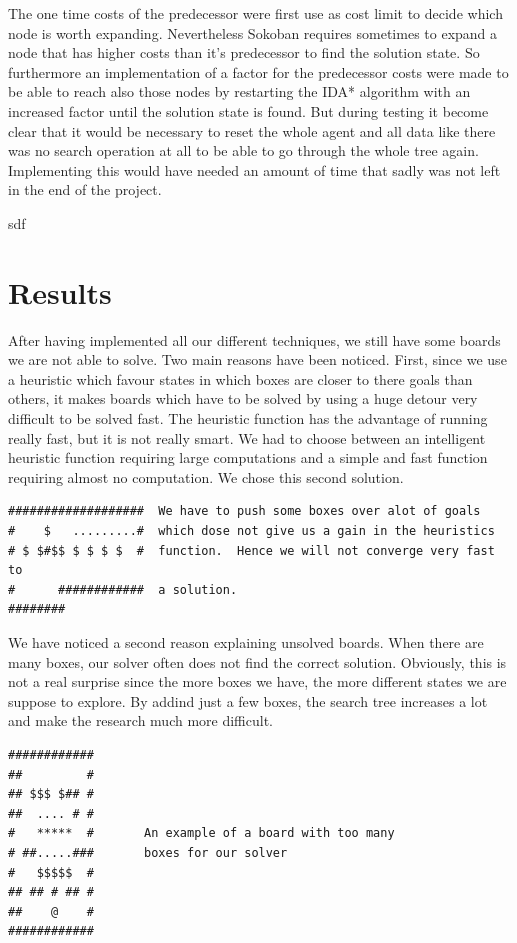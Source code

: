 \documentclass[a4paper,10pt]{article}
\begin{document}
	The one time costs of the predecessor were first use as cost limit to decide which node is worth expanding. Nevertheless 		Sokoban requires sometimes to expand a node that has higher costs than it's predecessor to find the solution state. 
	So furthermore an implementation of a factor for the predecessor costs were made to be able to reach also those nodes by 		restarting the IDA* algorithm with an increased factor until the solution state is found. But during testing it become clear 		that it would be necessary to reset the whole agent and all data like there was no search operation at all to be able to go 		through the whole tree again. Implementing this would have needed an amount of time that sadly was not left in the end of the 		project.

        sdf~\cite{solving_soko}


\section{Results}
After having implemented all our different techniques, we still have some boards we are not able to solve. Two main reasons have been noticed. First, since we use a heuristic which favour states in which boxes are closer to there goals than others, it makes boards which have to be solved by using a huge detour very difficult to be solved fast. The heuristic function has the advantage of running really fast, but it is not really smart. 
We had to choose between an intelligent heuristic function requiring large computations and a simple and fast function requiring almost no computation. We chose this second solution.
\begin{verbatim}
###################  We have to push some boxes over alot of goals
#    $   .........#  which dose not give us a gain in the heuristics
# $ $#$$ $ $ $ $  #  function.  Hence we will not converge very fast to
#      ############  a solution.
########
\end{verbatim}


We have noticed a second reason explaining unsolved boards. When there are many boxes, our solver often does not find the correct solution. Obviously, this is not a real surprise since the more boxes we have, the more different states we are suppose to explore. By addind just a few boxes, the search tree increases a lot and make the research much more difficult.

\begin{verbatim}
############
##         #
## $$$ $## #
##  .... # #
#   *****  #       An example of a board with too many
# ##.....###       boxes for our solver
#   $$$$$  #
## ## # ## #
##    @    #
############
\end{verbatim}
\end{document}
